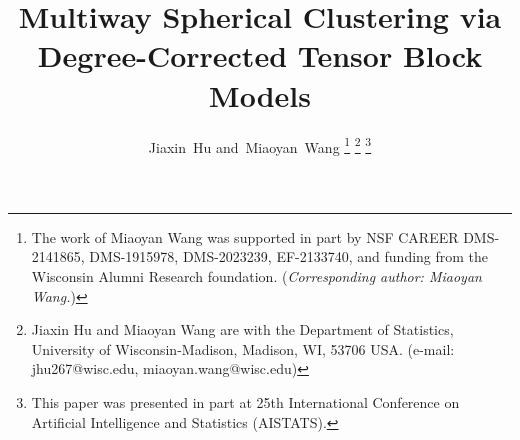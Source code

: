 \documentclass[journal]{IEEEtran}
\theoremstyle{definition}
\theoremstyle{definition}
\begin{document}
%
\title{Multiway Spherical Clustering via \\ Degree-Corrected Tensor Block Models}
%
%
%

\author{Jiaxin~Hu
        and~Miaoyan~Wang%
\thanks{The work of Miaoyan Wang was supported in part by NSF CAREER DMS-2141865, DMS-1915978, DMS-2023239, EF-2133740, and funding from the Wisconsin Alumni Research foundation. (\textit{Corresponding author: Miaoyan Wang.})}
\thanks{Jiaxin Hu and Miaoyan Wang are with the Department of Statistics, University of Wisconsin-Madison, Madison, WI, 53706 USA. (e-mail: jhu267@wisc.edu, miaoyan.wang@wisc.edu)}%
\thanks{This paper was presented in part at 25th International Conference on Artificial Intelligence and Statistics (AISTATS).}%
}

% 
%
\end{document}

